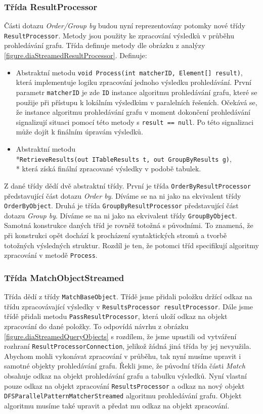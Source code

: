 \subsubsection{Třída ResultProcessor}

Části dotazu \textit{Order/Group by} budou nyní reprezentovány potomky nové třídy \texttt{ResultProcessor}.
Metody jsou použity ke zpracování výsledků v průběhu prohledávání grafu.
Třída definuje metody dle obrázku z analýzy \ref{figure.diaStreamedResultProcessor}.
Definuje:
\begin{itemize}
\item Abstraktní metodu \texttt{void Process(int matcherID, Element[] result)}, která implementuje logiku zpracování jednoho výsledku prohledávání.
První parametr \texttt{matcherID} je zde \texttt{ID} instance algoritmu prohledávání grafu, které se použije při přístupu k lokálním výsledkům v paralelních řešeních.
Očekává se, že instance algoritmu prohledávání grafu v moment dokončení prohledávání signalizují situaci pomocí této metody s \texttt{result == null}.
Po této signalizaci může dojít k finálním úpravám výsledků.
\item Abstraktní metodu \\*\texttt{RetrieveResults(out ITableResults t, out GroupByResults g)},\\* která získá finální zpracované výsledky v podobě tabulek. 
\end{itemize}
Z dané třídy dědí dvě abstraktní třídy.
První je třída \texttt{OrderByResultProcessor} představující část dotazu \textit{Order by}.
Díváme se na ni jako na ekvivalent třídy \texttt{OrderByObject}. 
Druhá je třída \texttt{GroupByResultProcessor} představující část dotazu \textit{Group by}.
Díváme se na ni jako na ekvivalent třídy \texttt{GroupByObject}.
Samotná konstrukce daných tříd je rovněž totožná s původními.
To znamená, že při konstrukci opět dochází k procházení syntaktických stromů a tvorbě totožných výsledných struktur.
Rozdíl je ten, že potomci tříd specifikují algoritmy zpracování v metodě \texttt{Process}.   

\subsubsection{Třída MatchObjectStreamed}

Třída dědí z třídy \texttt{MatchBaseObject}.
Třídě jsme přidali položku držící odkaz na třídu zpracovávající výsledky v \texttt{ResultsProcessor resultProcessor}.
Dále jsme třídě přidali metodu \texttt{PassResultProcessor}, která uloží odkaz na objekt zpracování do dané položky.
To odpovídá návrhu z obrázku \ref{figure.diaStreamedQueryObjects} s rozdílem, že jsme upustili od vytváření rozhraní \texttt{ResultProcessorConnection}, jelikož žádná jiná třída by jej nevyužila. 
Abychom mohli vykonávat zpracování v průběhu, tak nyní musíme upravit i samotné objekty prohledávání grafu.
Řekli jsme, že původní třída části \textit{Match} obsahuje odkaz na objekt prohledávání grafu a tabulku výsledků.
Nyní vlastní pouze odkaz na objekt zpracování \texttt{ResultsProcessor} a odkaz na nový objekt \texttt{DFSParallelPatternMatcherStreamed} algoritmu prohledávání grafu.
Objekt algoritmu musíme také upravit a předat mu odkaz na objekt zpracování.

